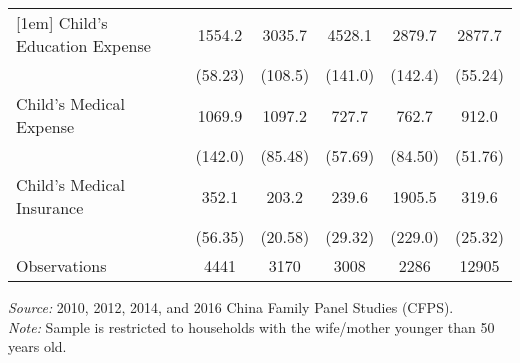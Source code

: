 \documentclass[12pt]{extarticle}
\begin{document}
\begin{table}
\begin{threeparttable}
\begin{tabular}{l*{5}{c}}
[1em]
Child's Education Expense&      1554.2&      3035.7&      4528.1&      2879.7&      2877.7\\
                    &     (58.23)&     (108.5)&     (141.0)&     (142.4)&     (55.24)\\
[1em]
Child's Medical Expense&      1069.9&      1097.2&       727.7&       762.7&       912.0\\
                    &     (142.0)&     (85.48)&     (57.69)&     (84.50)&     (51.76)\\
[1em]
Child's Medical Insurance&       352.1&       203.2&       239.6&      1905.5&       319.6\\
                    &     (56.35)&     (20.58)&     (29.32)&     (229.0)&     (25.32)\\
\hline
Observations        &        4441&        3170&        3008&        2286&      12905\\      
\hline\hline
\end{tabular}
\begin{tablenotes}
\footnotesize \textit{Source:} 2010, 2012, 2014, and 2016 China Family Panel Studies (CFPS). \\
\textit{Note:} Sample is restricted to households with the wife/mother younger than 50 years old.
\end{tablenotes}
\end{threeparttable}
\end{table}
\end{document}
